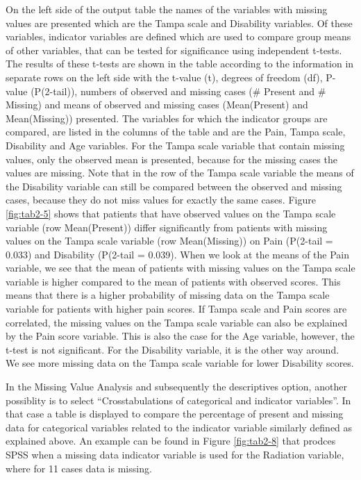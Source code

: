 \documentclass[
]{book}
\begin{document}
On the left side of the output table the names of the variables with missing values are presented which are the Tampa scale and Disability variables. Of these variables, indicator variables are defined which are used to compare group means of other variables, that can be tested for significance using independent t-tests. The results of these t-tests are shown in the table according to the information in separate rows on the left side with the t-value (t), degrees of freedom (df), P-value (P(2-tail)), numbers of observed and missing cases (\# Present and \# Missing) and means of observed and missing cases (Mean(Present) and Mean(Missing)) presented. The variables for which the indicator groups are compared, are listed in the columns of the table and are the Pain, Tampa scale, Disability and Age variables. For the Tampa scale variable that contain missing values, only the observed mean is presented, because for the missing cases the values are missing. Note that in the row of the Tampa scale variable the means of the Disability variable can still be compared between the observed and missing cases, because they do not miss values for exactly the same cases. Figure \ref{fig:tab2-5} shows that patients that have observed values on the Tampa scale variable (row Mean(Present)) differ significantly from patients with missing values on the Tampa scale variable (row Mean(Missing)) on Pain (P(2-tail = 0.033) and Disability (P(2-tail = 0.039). When we look at the means of the Pain variable, we see that the mean of patients with missing values on the Tampa scale variable is higher compared to the mean of patients with observed scores. This means that there is a higher probability of missing data on the Tampa scale variable for patients with higher pain scores. If Tampa scale and Pain scores are correlated, the missing values on the Tampa scale variable can also be explained by the Pain score variable. This is also the case for the Age variable, however, the t-test is not significant. For the Disability variable, it is the other way around. We see more missing data on the Tampa scale variable for lower Disability scores.

In the Missing Value Analysis and subsequently the descriptives option, another possiblity is to select ``Crosstabulations of categorical and indicator variables''. In that case a table is displayed to compare the percentage of present and missing data for categorical variables related to the indicator variable similarly defined as explained above. An example can be found in Figure \ref{fig:tab2-8} that prodces SPSS when a missing data indicator variable is used for the Radiation variable, where for 11 cases data is missing.
\end{document}
